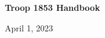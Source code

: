 \documentclass{ltxguide}
\begin{document}
\begin{titlepage}
    \centering
    \vfill
    {\bfseries\Huge
        Troop 1853 Handbook\\
    }    
    \vfill
	\begin{figure}
	\hfill
    \vfill
	\end{figure}
	April 1, 2023
\end{titlepage}
\newpage
\end{document}
